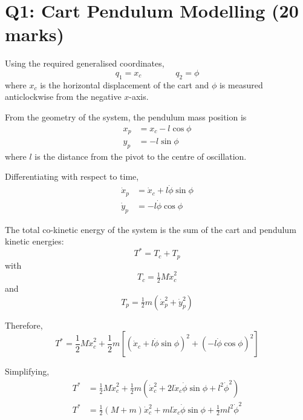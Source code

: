 \documentclass[11pt,a4paper]{article}
\begin{document}
\section*{Q1: Cart Pendulum Modelling \hfill (20 marks)}

Using the required generalised coordinates,
\begin{equation*}
	q_{1} = x_{c} \qquad\qquad q_{2} = \phi
\end{equation*}
where $x_{c}$ is the horizontal displacement of the cart and $\phi$ is measured
anticlockwise from the negative $x$-axis.

From the geometry of the system, the pendulum mass position is
\begin{align*}
	x_{p} &= x_{c} - l\cos\phi \\
	y_{p} &= -l\sin\phi
\end{align*}
where $l$ is the distance from the pivot to the centre of oscillation.

Differentiating with respect to time,
\begin{align*}
	\dot{x}_{p} &= \dot{x}_{c} + l\dot{\phi}\sin\phi \\
	\dot{y}_{p} &= -l\dot{\phi}\cos\phi
\end{align*}

The total co-kinetic energy of the system is the sum of the cart and pendulum
kinetic energies:
\begin{equation*}
	T^{*} = T_{c} + T_{p}
\end{equation*}
with
\begin{equation*}
	T_{c} = \tfrac{1}{2} M \dot{x}_{c}^{2}
\end{equation*}
and
\begin{equation*}
	T_{p} = \tfrac{1}{2} m \left( \dot{x}_{p}^{2} + \dot{y}_{p}^{2} \right)
\end{equation*}

Therefore,
\begin{equation*}
	T^{*} = \frac{1}{2} M \dot{x}_{c}^{2}
	+ \frac{1}{2} m \left[ \left( \dot{x}_{c} + l\dot{\phi}\sin\phi \right)^{2}
	+ \left( -l\dot{\phi}\cos\phi \right)^{2} \right]
\end{equation*}

Simplifying,
\begin{align*}
	T^{*} &= \frac{1}{2} M \dot{x}_{c}^{2}
	+ \frac{1}{2} m \left( \dot{x}_{c}^{2}
	+ 2 l \dot{x}_{c} \dot{\phi} \sin\phi + l^{2}\dot{\phi}^{2} \right) \\
	T^{*} &= \frac{1}{2} \left( M + m \right) \dot{x}_{c}^{2}
	+ m l \dot{x}_{c} \dot{\phi} \sin\phi
	+ \frac{1}{2} m l^{2} \dot{\phi}^{2}
\end{align*}
\end{document}
